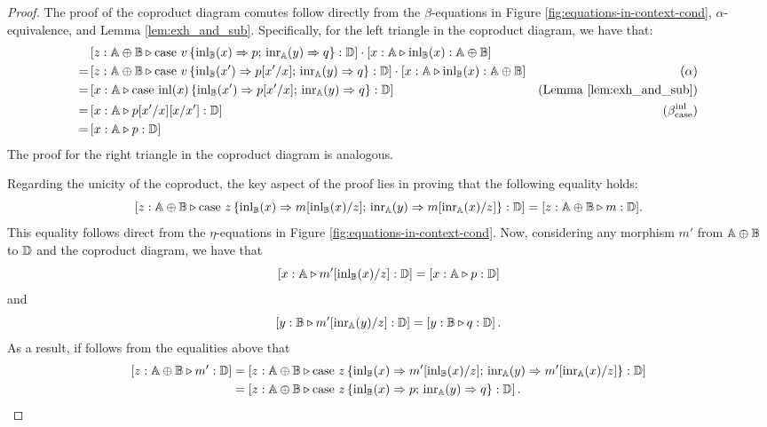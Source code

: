 \documentclass[10pt,a4paper]{amsart}
\theoremstyle{definition}
\theoremstyle{definition}
\theoremstyle{definition}
\theoremstyle{definition}
\theoremstyle{definition}
\theoremstyle{definition}
\begin{document}
\begin{proof}
The proof of the coproduct diagram comutes follow directly from the $\beta$-equations in Figure \ref{fig:equations-in-context-cond}, $\alpha$-equivalence, and Lemma \ref{lem:exh_and_sub}. Specifically, for the left triangle in the coproduct diagram, we have that:
  \begin{align*}
    & \left[z:\mathbb{A} \oplus \mathbb{B}  \triangleright \text{case } v\,\{\mathrm{inl}_{\mathbb{B}}(x) \Rightarrow p ; \, \mathrm{inr}_{\mathbb{A}}(y) \Rightarrow q\}: \mathbb{D}\right] \cdot \left[ x: \mathbb{A}\triangleright \mathrm{inl}_{\mathbb{B}}(x): \mathbb{A} \oplus \mathbb{B} \right] \\
    = &   \left[z:\mathbb{A} \oplus \mathbb{B}  \triangleright \text{case } v\,\{\mathrm{inl}_{\mathbb{B}}(x') \Rightarrow p[x'/ x] ; \, \mathrm{inr}_{\mathbb{A}}(y) \Rightarrow q\}: \mathbb{D}\right] \cdot \left[ x: \mathbb{A}\triangleright \mathrm{inl}_{\mathbb{B}}(x): \mathbb{A} \oplus \mathbb{B}\right] & (\alpha)\\
    = &  \left[x:\mathbb{A} \triangleright \text{case } \mathrm{inl}(x) \,\{\mathrm{inl}_{\mathbb{B}}(x') \Rightarrow p[x'/ x] ; \, \mathrm{inr}_{\mathbb{A}}(y) \Rightarrow q\}: \mathbb{D}\right] & (\text{Lemma } \ref{lem:exh_and_sub})  \\
    = &  \left[x:\mathbb{A} \triangleright p[x'/x][x/x']: \mathbb{D}\right] & (\beta_{\text{case}}^{\text{inl}}) \\
    = &  \left[x:\mathbb{A} \triangleright p: \mathbb{D}\right]  \\
  \end{align*}
  The proof for the right triangle in the coproduct diagram is analogous.
 
  Regarding the unicity of the coproduct, the key aspect of the proof lies in proving that the following equality holds: 
  $$\left[z:\mathbb{A} \oplus \mathbb{B}  \triangleright \text{case } z \,\{\mathrm{inl}_{\mathbb{B}}(x) \Rightarrow m[\mathrm{inl}_{\mathbb{B}}(x)/ z] ; \, \mathrm{inr}_{\mathbb{A}}(y) \Rightarrow m[\mathrm{inr}_{\mathbb{A}}(x)/ z]\}: \mathbb{D}\right] = [z:\mathbb{A} \oplus \mathbb{B} \triangleright m: \mathbb{D}].$$ 
  This equality follows direct from the $\eta$-equations in Figure \ref{fig:equations-in-context-cond}. Now, considering any morphism $m'$ from $\mathbb{A} \oplus \mathbb{B}$ to $\mathbb{D}$ and the coproduct diagram, we have that 
  $$\left[ x: \mathbb{A} \triangleright m'[ \mathrm{inl}_{\mathbb{B}}(x)/z]: \mathbb{D}\right]  = \left[x: \mathbb{A}  \triangleright p: \mathbb{D}\right]  $$ 
  and
  $$\left[ y: \mathbb{B}  \triangleright m'[\mathrm{inr}_{\mathbb{A}}(y)/z]: \mathbb{D}\right] = \left[y: \mathbb{B}  \triangleright q: \mathbb{D}\right].$$
  As a result, if follows from the equalities above that 
  \begin{align*}
    \left[z:\mathbb{A} \oplus \mathbb{B}  \triangleright m': \mathbb{D}\right]& =\left[z:\mathbb{A} \oplus \mathbb{B}  \triangleright \text{case } z \,\{\mathrm{inl}_{\mathbb{B}}(x) \Rightarrow m'[\mathrm{inl}_{\mathbb{B}}(x)/ z] ; \, \mathrm{inr}_{\mathbb{A}}(y) \Rightarrow m'[\mathrm{inr}_{\mathbb{A}}(x)/ z]\}: \mathbb{D}\right]\\
    & = \left[z:\mathbb{A} \oplus \mathbb{B}  \triangleright \text{case } z \,\{\mathrm{inl}_{\mathbb{B}}(x) \Rightarrow p ; \, \mathrm{inr}_{\mathbb{A}}(y) \Rightarrow q\}: \mathbb{D}\right]. 
  \end{align*}
 

\end{proof}
\end{document}
